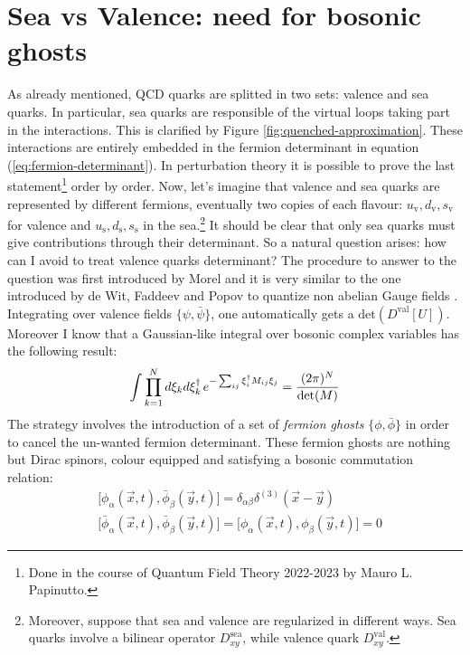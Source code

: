 \documentclass[english, LaM, oneside, noexaminfo]{sapthesis}
\begin{document}
\section{Sea vs Valence: need for bosonic ghosts}\label{sec:ghosts}
\noindent
As already mentioned, QCD quarks are splitted in two sets: valence and sea quarks.
In particular, sea quarks are responsible of the virtual loops taking part in the interactions.
This is clarified by Figure \ref{fig:quenched-approximation}.
These interactions are entirely embedded in the fermion determinant in equation (\ref{eq:fermion-determinant}).
In perturbation theory it is possible to prove the last statement\footnote{Done in the course of Quantum Field Theory 2022-2023 by Mauro L. Papinutto.} order by order.
Now, let's imagine that valence and sea quarks are represented by different fermions, eventually two copies of each flavour: $u_\text{v}, d_\text{v}, s_\text{v}$ for valence and $u_\text{s}, d_\text{s}, s_\text{s}$ in the sea.\footnote{Moreover, suppose that sea and valence are regularized in different ways. Sea quarks involve a bilinear operator $D^\text{sea}_{xy}$, while valence quark $D^\text{val}_{xy}$.}
It should be clear that only sea quarks must give contributions through their determinant.
So a natural question arises: how can I avoid to treat valence quarks determinant?
\newline
The procedure to answer to the question was first introduced by Morel \cite{Morel} and it is very similar to the one introduced by de Wit, Faddeev and Popov to quantize non abelian Gauge fields \cite{WeinbergII}.
Integrating over valence fields $\{\psi,\bar\psi\}$, one automatically gets a $\text{det}(D^\text{val}[U])$. 
Moreover I know that a Gaussian-like integral over bosonic complex variables has the following result:
\begin{equation*}
    \int \prod_{k = 1}^{N} d \xi_k  d\xi_k^\dag \hspace*{.5mm} e^{-\sum_{ij} \xi_i^\dag M_{ij} \xi_j} = \frac{(2\pi)^N}{\text{det}(M)}
\end{equation*}
The strategy involves the introduction of a set of {\it fermion ghosts} $\{\phi, \bar\phi \}$ in order to cancel the un-wanted fermion determinant.
These fermion ghosts are nothing but Dirac spinors, colour equipped and satisfying a bosonic commutation relation:
\begin{equation*}
    \begin{aligned}
        & \big[\phi_\alpha (\vec x,t), \bar\phi_\beta (\vec y,t)\big] = \delta_{\alpha\beta}\delta^{(3)}(\vec x-\vec y) \\
        & \big[\bar\phi_\alpha (\vec x,t), \bar\phi_\beta (\vec y,t)\big] = \big[\phi_\alpha (\vec x,t), \phi_\beta (\vec y,t)\big] = 0
    \end{aligned}    
\end{equation*}
\end{document}
